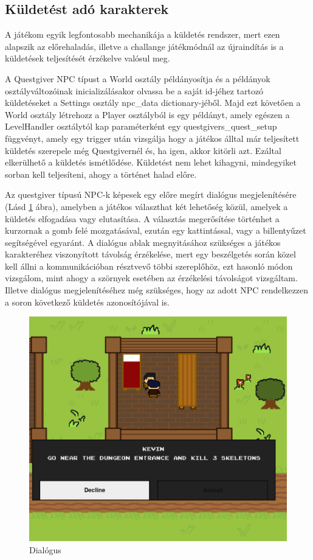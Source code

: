 \subsection{Küldetést adó karakterek}

\indent \indent A játékom egyik legfontosabb mechanikája a küldetés rendszer, mert ezen alapszik az előrehaladás, illetve a challange játékmódnál az újraindítás is a küldetések teljesítését érzékelve valósul meg. 

A Questgiver NPC típust a World osztály példányosítja és a példányok osztályváltozóinak inicializálásakor olvassa be a saját id-jéhez tartozó küldetéseket a Settings osztály npc\_data dictionary-jéből. Majd ezt követően a World osztály létrehozz a Player osztályból is egy példányt, amely egészen a LevelHandler osztálytól kap paraméterként egy questgivers\_quest\_setup függvényt, amely egy trigger után vizsgálja hogy a játékos álltal már teljesített küldetés szerepel\-e még Questgivernél és, ha igen, akkor kitörli azt. Ezáltal elkerülhető a küldetés ismétlődése. Küldetést nem lehet kihagyni, mindegyiket sorban kell teljesíteni, ahogy a történet halad előre.

Az questgiver típusú NPC-k képesek egy előre megírt dialógus megjelenítésére (Lásd \ref{fig:Dialógus rendszer} ábra), amelyben a játékos választhat két lehetőség közül, amelyek a küldetés elfogadása vagy elutasítása. A választás megerősítése történhet a kurzornak a gomb felé mozgatásával, ezután egy kattintással, vagy a billentyűzet segítségével egyaránt. A dialógus ablak megnyitásához szükséges a játékos karakteréhez viszonyított távolság érzékelése, mert egy beszélgetés során közel kell állni a kommunikációban résztvevő többi szereplőhöz, ezt hasonló módon vizsgálom, mint ahogy a szörnyek esetében az érzékelési távolságot vizsgáltam. Illetve dialógus megjelenítéséhez még szükséges, hogy az adott NPC rendelkezzen a soron következő küldetés azonosítójával is.   

\begin{figure}[H]
    \centering
    \includegraphics[width=14.0truecm]{images/dialogue.png}
    \caption{Dialógus}
    \label{fig:Dialógus rendszer}
\end{figure}

